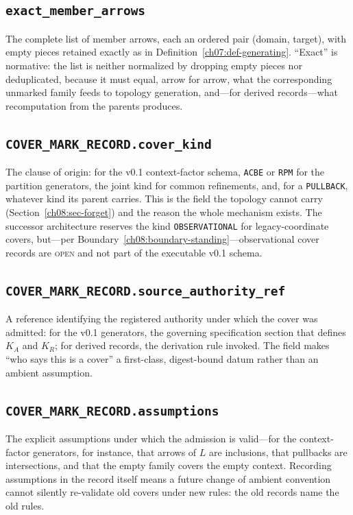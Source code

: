\subsection{\texttt{exact\_member\_arrows}}
The complete list of member arrows, each an ordered pair (domain, target), with empty pieces retained exactly as in Definition~\ref{ch07:def-generating}. ``Exact'' is normative: the list is neither normalized by dropping empty pieces nor deduplicated, because it must equal, arrow for arrow, what the corresponding unmarked family feeds to topology generation, and---for derived records---what recomputation from the parents produces.

\subsection{\texttt{COVER\_MARK\_RECORD.cover\_kind}}
The clause of origin: for the v0.1 context-factor schema, \texttt{ACBE} or \texttt{RPM} for the partition generators, the joint kind for common refinements, and, for a \texttt{PULLBACK}, whatever kind its parent carries. This is the field the topology cannot carry (Section~\ref{ch08:sec-forget}) and the reason the whole mechanism exists. The successor architecture reserves the kind \texttt{OBSERVATIONAL} for legacy-coordinate covers, but---per Boundary~\ref{ch08:boundary-standing}---observational cover records are \textsc{open} and not part of the executable v0.1 schema.

\subsection{\texttt{COVER\_MARK\_RECORD.source\_authority\_ref}}
A reference identifying the registered authority under which the cover was admitted: for the v0.1 generators, the governing specification section that defines $K_{A}$ and $K_{R}$; for derived records, the derivation rule invoked. The field makes ``who says this is a cover'' a first-class, digest-bound datum rather than an ambient assumption.

\subsection{\texttt{COVER\_MARK\_RECORD.assumptions}}
The explicit assumptions under which the admission is valid---for the context-factor generators, for instance, that arrows of $L$ are inclusions, that pullbacks are intersections, and that the empty family covers the empty context. Recording assumptions in the record itself means a future change of ambient convention cannot silently re-validate old covers under new rules: the old records name the old rules.

